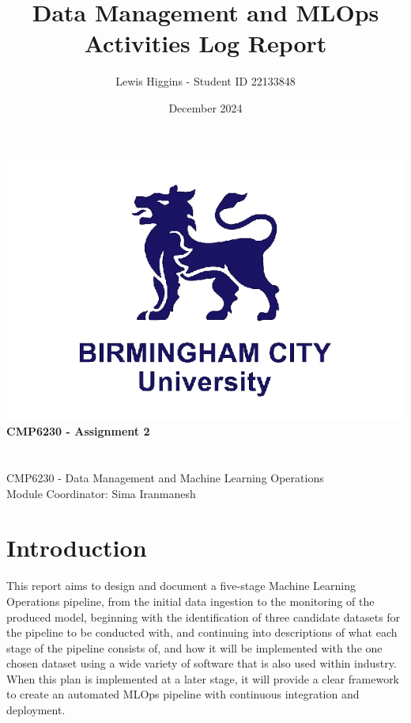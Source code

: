 \documentclass[12pt]{report}
\title{Data Management and MLOps Activities Log Report}
\author{Lewis Higgins - Student ID 22133848}
\date{December 2024}
\begin{document}
\makeatletter
\begin{titlepage}
    \begin{center}
        \includegraphics[width=0.7\linewidth]{BCU}\\[4ex]
        {\huge \bfseries CMP6230 - Assignment 2}\\[2ex]
        {\large \bfseries  \@title}\\[50ex]
        {\@author}\\[2ex]
        {CMP6230 - Data Management and Machine Learning Operations}\\[2ex]
        {Module Coordinator: Sima Iranmanesh}\\[10ex]
    \end{center}
\end{titlepage}
\makeatother
\thispagestyle{empty}
\newpage


\setcounter{page}{0}

\tableofcontents
\thispagestyle{empty}

\chapter*{Introduction}
This report aims to design and document a five-stage Machine Learning Operations pipeline, from the initial 
data ingestion to the monitoring of the produced model, beginning 
with the identification of three candidate datasets for the pipeline to be conducted with, and continuing 
into descriptions of what each stage of the pipeline consists of, and how it will be implemented with the
one chosen dataset using a wide variety of software that is also used within industry. When this plan 
is implemented at a later stage, it will provide a clear framework to create an automated MLOps pipeline
with continuous integration and deployment.
\end{document}
